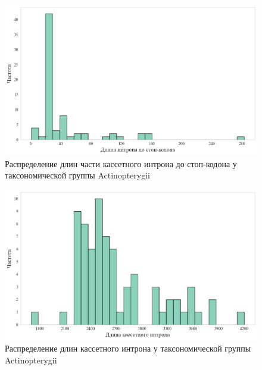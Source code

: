 \newpage
\begin{figure}[h] %
    \centering
    \includegraphics[width=1.0\textwidth]{images/Actinopterygii_intron_stop}
    \caption{Распределение длин части кассетного интрона до стоп-кодона у таксономической группы Actinopterygii}
    \label{fig:Actinopterygii_intron_stop}
\end{figure}

\newpage
\begin{figure}[h] %
    \centering
    \includegraphics[width=1.0\textwidth]{images/Actinopterygii_intron}
    \caption{Распределение длин кассетного интрона у таксономической группы Actinopterygii}
    \label{fig:Actinopterygii_intron}
\end{figure}


